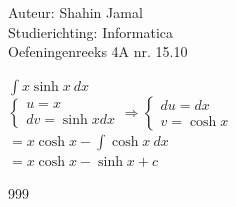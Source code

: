 \documentclass[a4paper]{article}
\begin{document}
  
\noindent \large Auteur: Shahin Jamal \\
\noindent \large Studierichting: Informatica\\
\noindent \large Oefeningenreeks 4A nr. 15.10\\

\medskip

\normalsize

$\displaystyle\int x \sinh x \ dx$\\

$\left\{
   \begin{array}{l}
       u = x\\
       dv = \sinh x dx
   \end{array}
\right.
\Rightarrow
\left\{
   \begin{array}{l}
       du = dx \\
       v = \cosh x
   \end{array}
\right.$\\

$= x\cosh x - \displaystyle\int \cosh x \ dx$\\

$= x \cosh x - \sinh x + c$\\

\begin{thebibliography}{999}
\end{thebibliography}
\end{document}
